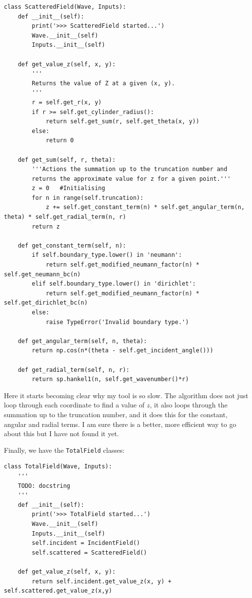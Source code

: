\begin{lstlisting}
class ScatteredField(Wave, Inputs):
    def __init__(self):
        print('>>> ScatteredField started...')
        Wave.__init__(self)
        Inputs.__init__(self)

    def get_value_z(self, x, y):
        '''
        Returns the value of Z at a given (x, y).
        '''
        r = self.get_r(x, y)
        if r >= self.get_cylinder_radius():
            return self.get_sum(r, self.get_theta(x, y))
        else:
            return 0

    def get_sum(self, r, theta):
        '''Actions the summation up to the truncation number and
        returns the approximate value for z for a given point.'''
        z = 0   #Initialising
        for n in range(self.truncation):
            z += self.get_constant_term(n) * self.get_angular_term(n, theta) * self.get_radial_term(n, r)
        return z

    def get_constant_term(self, n):
        if self.boundary_type.lower() in 'neumann':
            return self.get_modified_neumann_factor(n) * self.get_neumann_bc(n)
        elif self.boundary_type.lower() in 'dirichlet':
            return self.get_modified_neumann_factor(n) * self.get_dirichlet_bc(n)
        else:
            raise TypeError('Invalid boundary type.')

    def get_angular_term(self, n, theta):
        return np.cos(n*(theta - self.get_incident_angle()))

    def get_radial_term(self, n, r):
        return sp.hankel1(n, self.get_wavenumber()*r)\end{lstlisting}

Here it starts becoming clear why my tool is so slow. The algorithm does not just loop through each coordinate to find a value of $z$, it also loops through the summation up to the truncation number, and it does this for the constant, angular and radial terms. I am sure there is a better, more efficient way to go about this but I have not found it yet.

Finally, we have the \verb!TotalField! classes:
\begin{lstlisting}
class TotalField(Wave, Inputs):
    '''
    TODO: docstring
    '''
    def __init__(self):
        print('>>> TotalField started...')
        Wave.__init__(self)
        Inputs.__init__(self)
        self.incident = IncidentField()
        self.scattered = ScatteredField()

    def get_value_z(self, x, y):
        return self.incident.get_value_z(x, y) + self.scattered.get_value_z(x,y)
\end{lstlisting}

